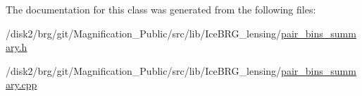 The documentation for this class was generated from the following files\+:\begin{DoxyCompactItemize}
\item 
/disk2/brg/git/\+Magnification\+\_\+\+Public/src/lib/\+Ice\+B\+R\+G\+\_\+lensing/\hyperlink{pair__bins__summary_8h}{pair\+\_\+bins\+\_\+summary.\+h}\item 
/disk2/brg/git/\+Magnification\+\_\+\+Public/src/lib/\+Ice\+B\+R\+G\+\_\+lensing/\hyperlink{pair__bins__summary_8cpp}{pair\+\_\+bins\+\_\+summary.\+cpp}\end{DoxyCompactItemize}
